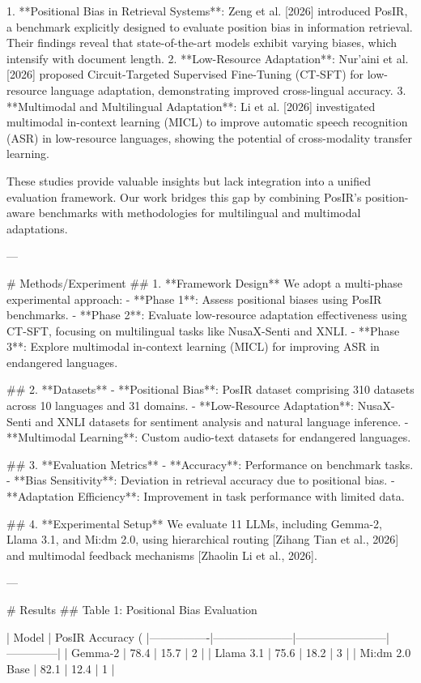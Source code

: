 1. **Positional Bias in Retrieval Systems**: Zeng et al. [2026] introduced PosIR, a benchmark explicitly designed to evaluate position bias in information retrieval. Their findings reveal that state-of-the-art models exhibit varying biases, which intensify with document length.  
2. **Low-Resource Adaptation**: Nur'aini et al. [2026] proposed Circuit-Targeted Supervised Fine-Tuning (CT-SFT) for low-resource language adaptation, demonstrating improved cross-lingual accuracy.  
3. **Multimodal and Multilingual Adaptation**: Li et al. [2026] investigated multimodal in-context learning (MICL) to improve automatic speech recognition (ASR) in low-resource languages, showing the potential of cross-modality transfer learning.  

These studies provide valuable insights but lack integration into a unified evaluation framework. Our work bridges this gap by combining PosIR's position-aware benchmarks with methodologies for multilingual and multimodal adaptations.  

---

# Methods/Experiment  
## 1. **Framework Design**  
We adopt a multi-phase experimental approach:  
- **Phase 1**: Assess positional biases using PosIR benchmarks.  
- **Phase 2**: Evaluate low-resource adaptation effectiveness using CT-SFT, focusing on multilingual tasks like NusaX-Senti and XNLI.  
- **Phase 3**: Explore multimodal in-context learning (MICL) for improving ASR in endangered languages.  

## 2. **Datasets**  
- **Positional Bias**: PosIR dataset comprising 310 datasets across 10 languages and 31 domains.  
- **Low-Resource Adaptation**: NusaX-Senti and XNLI datasets for sentiment analysis and natural language inference.  
- **Multimodal Learning**: Custom audio-text datasets for endangered languages.  

## 3. **Evaluation Metrics**  
- **Accuracy**: Performance on benchmark tasks.  
- **Bias Sensitivity**: Deviation in retrieval accuracy due to positional bias.  
- **Adaptation Efficiency**: Improvement in task performance with limited data.  

## 4. **Experimental Setup**  
We evaluate 11 LLMs, including Gemma-2, Llama 3.1, and Mi:dm 2.0, using hierarchical routing [Zihang Tian et al., 2026] and multimodal feedback mechanisms [Zhaolin Li et al., 2026].  

---

# Results  
## Table 1: Positional Bias Evaluation  

| Model          | PosIR Accuracy (%
|----------------|---------------------|------------------------|--------------|  
| Gemma-2        | 78.4               | 15.7                   | 2            |  
| Llama 3.1      | 75.6               | 18.2                   | 3            |  
| Mi:dm 2.0 Base | 82.1               | 12.4                   | 1            |  

